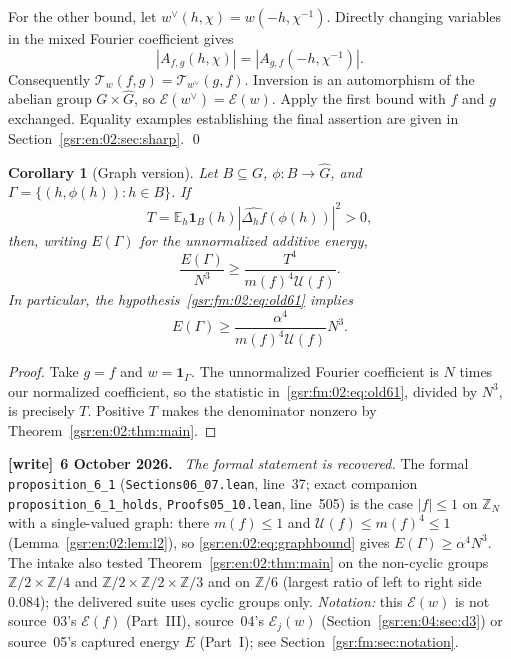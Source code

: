 \documentclass[11pt,letterpaper]{article}
\numberwithin{equation}{section}
\newtheorem{corollary}[theorem]{Corollary}
\theoremstyle{definition}
\theoremstyle{remark}
\newcommand{\E}{\mathbb E}
\newcommand{\Z}{\mathbb Z}
\newcommand{\one}{\mathbf 1}
\newcommand{\1}{\mathbf 1}
\newcommand{\U}{\mathcal U}
\newcommand{\calE}{\mathcal E}
\newcommand{\calT}{\mathcal T}
\newcommand{\file}[1]{\nolinkurl{#1}}
\newenvironment{writenote}[1][]{\par\smallskip\begingroup\small
 \noindent\textbf{[write]}\if\relax\detokenize{#1}\relax\else~\textbf{#1.}\fi\ }%
 {\par\endgroup\smallskip}
\begin{document}
For the other bound, let $w^\vee(h,\chi)=w(-h,\chi^{-1})$. Directly changing variables in the mixed Fourier coefficient gives
\[
 |A_{f,g}(h,\chi)|=|A_{g,f}(-h,\chi^{-1})|.
\]
Consequently $\calT_w(f,g)=\calT_{w^\vee}(g,f)$. Inversion is an automorphism of the abelian group $G\times\widehat G$, so $\calE(w^\vee)=\calE(w)$. Apply the first bound with $f$ and $g$ exchanged. Equality examples establishing the final assertion are given in Section~\ref{gsr:en:02:sec:sharp}. \qed

\begin{corollary}[Graph version]\label{gsr:en:02:cor:graph}
Let $B\subseteq G$, $\phi:B\to\widehat G$, and $\Gamma=\{(h,\phi(h)):h\in B\}$. If
\[
 T=\E_h\one_B(h)|\widehat{\Delta_hf}(\phi(h))|^2>0,
\]
then, writing $E(\Gamma)$ for the unnormalized additive energy,
\begin{equation}\label{gsr:en:02:eq:graphbound}
 \frac{E(\Gamma)}{N^3}\geq\frac{T^4}{m(f)^4\U(f)}.
\end{equation}
In particular, the hypothesis~\eqref{gsr:fm:02:eq:old61} implies
\[
 E(\Gamma)\geq\frac{\alpha^4}{m(f)^4\U(f)}N^3.
\]
\end{corollary}
\begin{proof}
Take $g=f$ and $w=\one_\Gamma$. The unnormalized Fourier coefficient is $N$ times our normalized coefficient, so the statistic in~\eqref{gsr:fm:02:eq:old61}, divided by $N^3$, is precisely $T$. Positive $T$ makes the denominator nonzero by Theorem~\ref{gsr:en:02:thm:main}.
\end{proof}
\begin{writenote}[6 October 2026]
\emph{The formal statement is recovered.} The formal \file{proposition_6_1} (\file{Sections06\_07.lean}, line~37; exact companion \file{proposition_6_1_holds}, \file{Proofs05\_10.lean}, line~505) is the case $|f|\le1$ on $\Z_N$ with a single-valued graph: there $m(f)\le1$ and $\U(f)\le m(f)^4\le1$ (Lemma~\ref{gsr:en:02:lem:l2}), so \eqref{gsr:en:02:eq:graphbound} gives $E(\Gamma)\ge\alpha^4N^3$. The intake also tested Theorem~\ref{gsr:en:02:thm:main} on the non-cyclic groups $\Z/2\times\Z/4$ and $\Z/2\times\Z/2\times\Z/3$ and on $\Z/6$ (largest ratio of left to right side $0.084$); the delivered suite uses cyclic groups only. \emph{Notation:} this $\calE(w)$ is not source~03's $\mathcal E(f)$ (Part~III), source~04's $\mathcal E_j(w)$ (Section~\ref{gsr:en:04:sec:d3}) or source~05's captured energy $E$ (Part~I); see Section~\ref{gsr:fm:sec:notation}.
\end{writenote}
\end{document}
